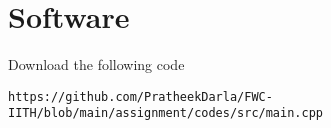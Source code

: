 \documentclass[10pt, a4paper]{article}
\begin{document}
\vspace{10mm}    

\section{Software}
 Download the following code
 \begin{lstlisting}
https://github.com/PratheekDarla/FWC-IITH/blob/main/assignment/codes/src/main.cpp
 \end{lstlisting}
\end{document}
